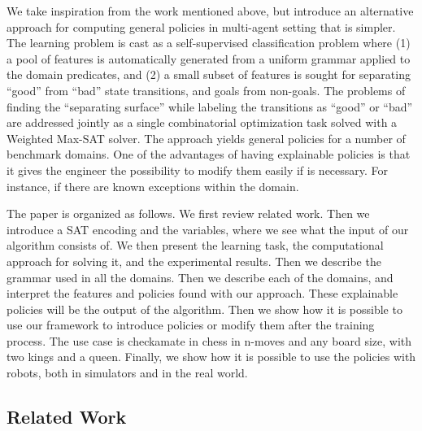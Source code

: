 \documentclass[a4paper]{article}
\begin{document}
We take inspiration from the work mentioned above, but introduce an alternative approach for computing general policies in multi-agent setting that is simpler. The learning problem is cast as a self-supervised classification problem where (1) a pool of features is automatically generated from a uniform grammar applied to the domain predicates, and (2) a small subset of features is sought for separating “good” from “bad” state transitions, and goals from non-goals. The problems of finding the “separating surface” while labeling the transitions as “good” or “bad” are addressed jointly as a single combinatorial optimization task solved with a Weighted Max-SAT solver. The approach yields general policies for a number of benchmark domains. One of the advantages of having explainable policies is that it gives the engineer the possibility to modify them easily if is necessary. For instance, if there are known exceptions within the domain.

The paper is organized as follows. We first review related work. Then we introduce a SAT encoding and the variables, where we see what the input of our algorithm consists of. We then present the learning task, the computational approach for solving it, and the experimental results. Then we describe the grammar used in all the domains. Then we describe each of the domains, and interpret the features and policies found with our approach. These explainable policies will be the output of the algorithm. Then we show how it is possible to use our framework to introduce policies or modify them after the training process. The use case is checkamate in chess in n-moves and any board size, with two kings and a queen. Finally, we show how it is possible to use the policies with robots, both in simulators and in the real world.

\subsection{Related Work}

\end{document}
